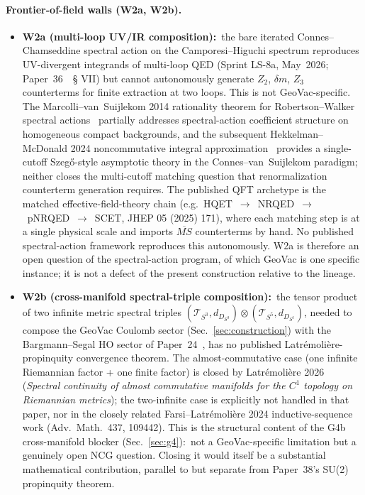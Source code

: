 \documentclass[11pt]{article}
\begin{document}
\paragraph{Frontier-of-field walls (W2a, W2b).}

\begin{itemize}\setlength{\itemsep}{2pt}
\item \textbf{W2a (multi-loop UV/IR composition):}\ the bare
iterated Connes--Chamseddine spectral action on the
Camporesi--Higuchi spectrum reproduces UV-divergent integrands of
multi-loop QED (Sprint LS-8a, May~2026; Paper~36~\cite{paper36}~\S
VII) but cannot autonomously generate $Z_2$, $\delta m$, $Z_3$
counterterms for finite extraction at two loops.  This is not
GeoVac-specific.  The Marcolli--van~Suijlekom 2014 rationality theorem
for Robertson--Walker spectral actions~\cite{marcolli_vs2014}
partially addresses spectral-action coefficient structure on
homogeneous compact backgrounds, and the subsequent Hekkelman--McDonald
2024 noncommutative integral approximation~\cite{hekkelman_mcdonald2024}
provides a single-cutoff Szeg\H{o}-style asymptotic theory in the
Connes--van~Suijlekom paradigm; neither closes the multi-cutoff
matching question that renormalization counterterm generation
requires.  The published QFT archetype is the matched effective-field-theory
chain (e.g.\ HQET~$\to$~NRQED~$\to$~pNRQED~$\to$~SCET, JHEP 05 (2025)
171), where each matching step is at a single physical scale and
imports $\overline{MS}$ counterterms by hand.  No published spectral-action
framework reproduces this autonomously.  W2a is therefore an open
question of the spectral-action program, of which GeoVac is one
specific instance; it is not a defect of the present construction
relative to the lineage.

\item \textbf{W2b (cross-manifold spectral-triple composition):}\ the
tensor product of two infinite metric spectral triples
$(\mathcal{T}_{S^3}, d_{D_{S^3}}) \otimes (\mathcal{T}_{S^5}, d_{D_{S^5}})$,
needed to compose the GeoVac Coulomb sector (Sec.~\ref{sec:construction})
with the Bargmann--Segal HO sector of Paper~24~\cite{paper24}, has no
published Latr\'emoli\`ere-propinquity convergence theorem.  The
almost-commutative case (one infinite Riemannian factor + one finite
factor) is closed by Latr\'emoli\`ere 2026~\cite{latremoliere2026}
(\emph{Spectral continuity of almost commutative manifolds for the
$C^1$ topology on Riemannian metrics}); the two-infinite case is
explicitly not handled in that paper, nor in the closely related
Farsi--Latr\'emoli\`ere 2024 inductive-sequence work (Adv.\ Math.\ 437,
109442).  This is the structural content of the G4b cross-manifold
blocker (Sec.~\ref{sec:g4}):\ not a GeoVac-specific limitation but a
genuinely open NCG question.  Closing it would itself be a substantial
mathematical contribution, parallel to but separate from Paper~38's
SU(2) propinquity theorem.
\end{itemize}
\end{document}

